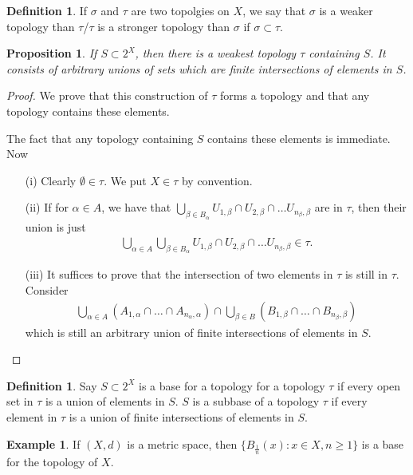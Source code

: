 \documentclass[11pt]{amsart}
\newtheorem{proposition}[theorem]{Proposition}
\theoremstyle{definition}
\newtheorem{definition}[theorem]{Definition}
\newtheorem{example}[theorem]{Example}
\numberwithin{equation}{section}
\begin{document}
\begin{definition}
    If $\sigma$ and $\tau$ are two topolgies on $X$, we say that $\sigma$ is a weaker topology than $\tau$/$\tau$ is a stronger topology than $\sigma$ if $\sigma\subset\tau$.
\end{definition}
\begin{proposition}
    If $S\subset 2^X$, then there is a weakest topology $\tau$ containing $S$. It consists of arbitrary unions of sets which are finite intersections of elements in $S$.
\end{proposition}
\begin{proof}
    We prove that this construction of $\tau$ forms a topology and that any topology contains these elements.

    The fact that any topology containing $S$ contains these elements is immediate. Now
    \begin{enumerate}
        \item [(i)] Clearly $\emptyset\in\tau$. We put $X\in\tau$ by convention.
        \item [(ii)] If for $\alpha\in A$, we have that $\bigcup_{\beta\in B_\alpha}U_{1,\beta}\cap U_{2,\beta}\cap\ldots U_{n_\beta,\beta}$ are in $\tau$, then their union is just
        \begin{align*}
            \bigcup_{\alpha\in A}\bigcup_{\beta\in B_{\alpha}}U_{1,\beta}\cap U_{2,\beta}\cap\ldots U_{n_\beta,\beta}\in \tau.
        \end{align*}
        \item [(iii)] It suffices to prove that the intersection of two elements in $\tau$ is still in $\tau$. Consider
        \begin{align*}
            \bigcup_{\alpha\in A}(A_{1,\alpha}\cap\ldots \cap A_{n_{\alpha},\alpha})\cap\bigcup_{\beta\in B}(B_{1,\beta}\cap\ldots \cap B_{n_\beta,\beta})
        \end{align*}
        which is still an arbitrary union of finite intersections of elements in $S$.
    \end{enumerate}
\end{proof}
\begin{definition}
    Say $S\subset 2^X$ is a base for a topology for a topology $\tau$ if every open set in $\tau$ is a union of elements in $S$. $S$ is a subbase of a topology $\tau$ if every element in $\tau$ is a union of finite intersections of elements in $S$.
\end{definition}
\begin{example}
    If $(X,d)$ is a metric space, then $\{B_\frac{1}{n}(x):x\in X,n\ge 1\}$ is a base for the topology of $X$.
\end{example}
\end{document}
